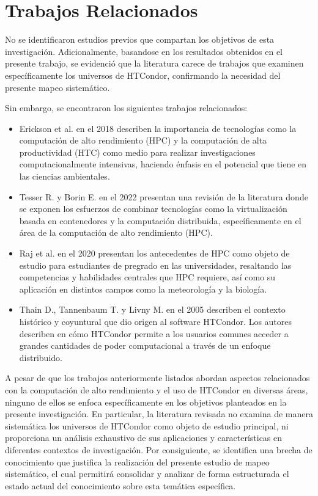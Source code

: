 \section{Trabajos Relacionados}\label{sec:trabajos-relacionados}

No se identificaron estudios previos que compartan los objetivos de
esta investigación. Adicionalmente, basandose en los resultados obtenidos
en el presente trabajo, se evidenció que la literatura carece de trabajos
que examinen específicamente los universos de HTCondor, confirmando
la necesidad del presente mapeo sistemático.

Sin embargo, se encontraron los siguientes trabajos relacionados:

\begin{itemize}[label=--]
	\item Erickson et al. en el 2018 \cite{EricksonA-01} describen la importancia de tecnologías como la computación
	      de alto rendimiento (HPC) y la computación de alta productividad (HTC) como medio para
	      realizar investigaciones computacionalmente intensivas, haciendo énfasis en el potencial
	      que tiene en las ciencias ambientales.

	\item Tesser R. y Borin E. en el 2022 \cite{KellerTesser2023} presentan una revisión de la literatura
	      donde se exponen los esfuerzos de combinar tecnologías como la virtualización basada
	      en contenedores y la computación distribuida, específicamente en el área de la computación
	      de alto rendimiento (HPC).

	\item Raj et al. en el 2020 \cite{RajRomanowski2020} presentan los antecedentes de HPC como objeto de estudio para estudiantes de pregrado en las universidades,
	      resaltando las competencias y habilidades centrales que HPC requiere, así como su aplicación en distintos campos como la meteorología
	      y la biología.

	\item Thain D., Tannenbaum T. y Livny M. en el 2005 \cite{Livny-Tannenbaum2005} describen el contexto histórico y coyuntural que dio
	      origen al software HTCondor. Los autores describen en cómo HTCondor permite a los usuarios comunes
	      acceder a grandes cantidades de poder computacional a través de un enfoque distribuido.
\end{itemize}

A pesar de que los trabajos anteriormente listados abordan aspectos relacionados con la computación
de alto rendimiento y el uso de HTCondor en diversas áreas, ninguno de ellos se enfoca específicamente
en los objetivos planteados en la presente investigación. En particular, la literatura revisada
no examina de manera sistemática los universos de HTCondor como objeto de estudio principal,
ni proporciona un análisis exhaustivo de sus aplicaciones y características en diferentes
contextos de investigación. Por consiguiente, se identifica una brecha de conocimiento que
justifica la realización del presente estudio de mapeo sistemático, el cual permitirá consolidar y
 analizar de forma estructurada el estado actual del conocimiento sobre esta temática específica.